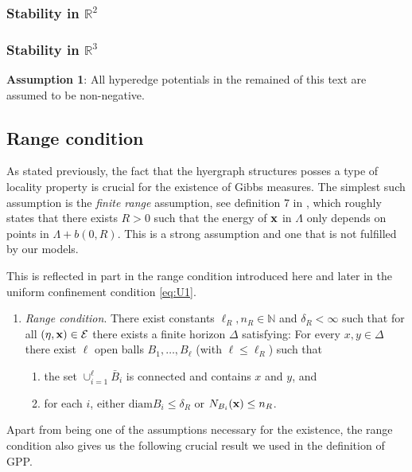 \subsubsection{Stability in $\mathbb R^2$}
\tbd
\subsubsection{Stability in $\mathbb R^3$}
\tbd
{}

\noindent \textbf{Assumption 1}: All hyperedge potentials in the remained of this text are assumed to be non-negative.

\subsection{Range condition} \label{sec:range}
As stated previously, the fact that the hyergraph structures posses a type of locality property is crucial for the existence of Gibbs measures. The simplest such assumption is the \textit{finite range} assumption, see definition 7 in \cite{Dereudre2017}, which roughly states that there exists $R>0$ such that the energy of ${\mathbf{x}}$ in $\Lambda$ only depends on points in $\Lambda + b(0,R)$. This is a strong assumption and one that is not fulfilled by our models. 

This is reflected in part in the range condition introduced here and later in the uniform confinement condition \ref{eq:U1}.

\begin{enumerate}[\textbf{(R)}]\label{(R)}
	\item \textit{Range condition}. There exist constants $\ell_R,n_R \in \mathbb N$ and $\delta_R < \infty$ such that for all $(\eta,{\mathbf{x}}) \in \mathcal E$ there exists a finite horizon $\Delta$ satisfying: For every $x,y \in \Delta$ there exist $\ell$ open balls $B_1, \dots, B_\ell$ (with $\ell \leq \ell_R$) such that
	\begin{enumerate}[-]
		\item the set $\cup^\ell_{i=1} \bar B_i$ is connected and contains $x$ and $y$, and 
		\item for each $i$, either $\text{diam} B_i \leq \delta_R$ or $N_{B_i}({\mathbf{x}}) \leq n_R$.
	\end{enumerate}
\end{enumerate}


Apart from being one of the assumptions necessary for the existence, the range condition also gives us the following crucial result we used in the definition of GPP.

